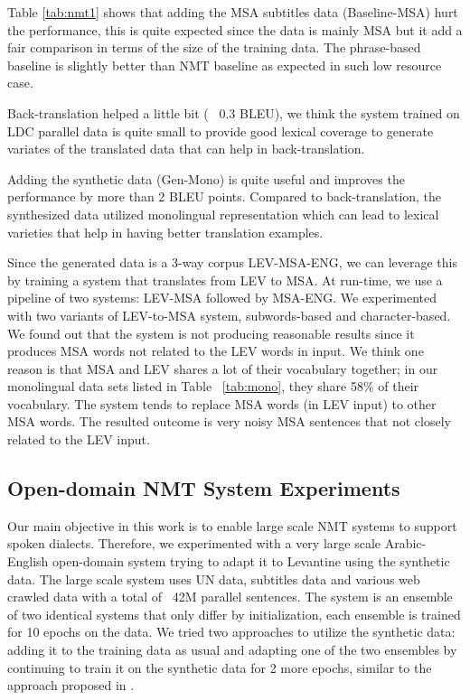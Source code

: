 \documentclass[a4paper]{article}
\begin{document}
Table \ref{tab:nmt1} shows that adding the MSA subtitles data (Baseline-MSA) hurt the performance, this is quite expected since the data is mainly MSA but it add a fair comparison in terms of the size of the training data. The phrase-based baseline is slightly better than NMT baseline as expected in such low resource case.


Back-translation helped a little bit ( ~0.3 BLEU), we think the system trained on LDC parallel data is quite small to provide good lexical coverage to generate variates of  the translated data that can help in back-translation.

Adding the synthetic data (Gen-Mono) is quite useful and improves the performance by more than 2 BLEU points. Compared to back-translation, the synthesized data utilized  monolingual representation which can lead to lexical varieties that help in having better translation examples.


Since the generated data is a 3-way corpus LEV-MSA-ENG, we can leverage this by training a system that translates from LEV to MSA. At run-time, we use a pipeline of two systems: LEV-MSA followed by MSA-ENG. We experimented with two variants of LEV-to-MSA system, subwords-based and character-based. We found out that the system is not producing reasonable results since it produces MSA words not related to the LEV words in input.  We think one  reason is that MSA and LEV shares a lot of their vocabulary together; in our monolingual data sets listed in Table ~\ref{tab:mono}, they share 58\% of their vocabulary. The system tends to replace MSA words (in LEV input) to other MSA words. The resulted outcome is very noisy MSA sentences that not closely related to the LEV input.



\subsection{Open-domain NMT System Experiments}
Our main objective in this work is to enable large scale NMT systems to support spoken dialects. Therefore, we experimented  with a very large scale Arabic-English open-domain system trying to adapt it to Levantine using the synthetic  data. The large scale system uses UN data,  subtitles data and various web crawled data with a total of ~42M parallel sentences. The system is an ensemble of two identical systems that only differ by initialization, each ensemble is trained for 10 epochs on the data. We tried two approaches to utilize the synthetic data: adding it to the training data as usual and adapting one of the two ensembles by continuing to train it on the synthetic data for 2 more epochs, similar to the approach proposed in \cite{FreitagA16}.
\end{document}
